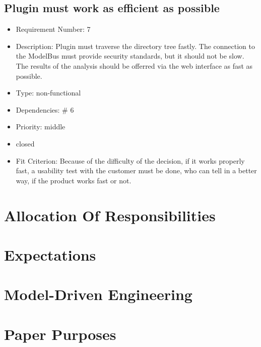\subsection{Plugin must work as efficient as possible}
\begin{itemize}
\item Requirement Number: 7
\item Description: Plugin must traverse the directory tree fastly. The connection to the ModelBus must provide security standards, but it should not be slow. The results of the analysis should be offerred via the web interface as fast as possible.
\item Type: non-functional
\item Dependencies: \# 6
\item Priority: middle
\item closed
\item Fit Criterion: Because of the difficulty of the decision, if it works properly fast, a usability test with the customer must be done, who can tell in a better way, if the product works fast or not.
\end{itemize} 

\section{Allocation Of Responsibilities}

\section{Expectations}


\section{Model-Driven Engineering}


\section{Paper Purposes}
